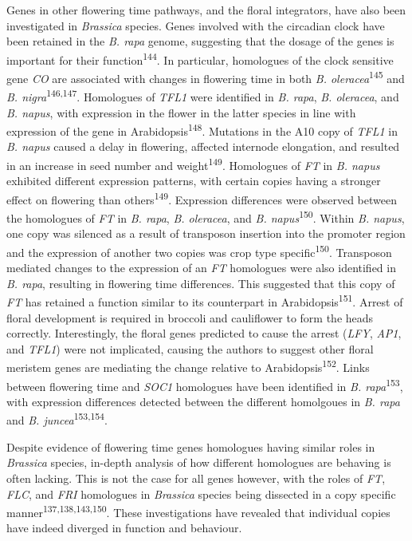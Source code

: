 \documentclass[12pt,]{book}
\begin{document}
Genes in other flowering time pathways, and the floral integrators, have
also been investigated in \emph{Brassica} species. Genes involved with
the circadian clock have been retained in the \emph{B. rapa} genome,
suggesting that the dosage of the genes is important for their
function\textsuperscript{144}. In particular, homologues of the clock
sensitive gene \emph{CO} are associated with changes in flowering time
in both \emph{B. oleracea}\textsuperscript{145} and \emph{B.
nigra}\textsuperscript{146,147}. Homologues of \emph{TFL1} were
identified in \emph{B. rapa}, \emph{B. oleracea}, and \emph{B. napus},
with expression in the flower in the latter species in line with
expression of the gene in Arabidopsis\textsuperscript{148}. Mutations in
the A10 copy of \emph{TFL1} in \emph{B. napus} caused a delay in
flowering, affected internode elongation, and resulted in an increase in
seed number and weight\textsuperscript{149}. Homologues of \emph{FT} in
\emph{B. napus} exhibited different expression patterns, with certain
copies having a stronger effect on flowering than
others\textsuperscript{149}. Expression differences were observed
between the homologues of \emph{FT} in \emph{B. rapa}, \emph{B.
oleracea}, and \emph{B. napus}\textsuperscript{150}. Within \emph{B.
napus}, one copy was silenced as a result of transposon insertion into
the promoter region and the expression of another two copies was crop
type specific\textsuperscript{150}. Transposon mediated changes to the
expression of an \emph{FT} homologues were also identified in \emph{B.
rapa}, resulting in flowering time differences. This suggested that this
copy of \emph{FT} has retained a function similar to its counterpart in
Arabidopsis\textsuperscript{151}. Arrest of floral development is
required in broccoli and cauliflower to form the heads correctly.
Interestingly, the floral genes predicted to cause the arrest
(\emph{LFY}, \emph{AP1}, and \emph{TFL1}) were not implicated, causing
the authors to suggest other floral meristem genes are mediating the
change relative to Arabidopsis\textsuperscript{152}. Links between
flowering time and \emph{SOC1} homologues have been identified in
\emph{B. rapa}\textsuperscript{153}, with expression differences
detected between the different homolgoues in \emph{B. rapa} and \emph{B.
juncea}\textsuperscript{153,154}.

Despite evidence of flowering time genes homologues having similar roles
in \emph{Brassica} species, in-depth analysis of how different
homologues are behaving is often lacking. This is not the case for all
genes however, with the roles of \emph{FT}, \emph{FLC}, and \emph{FRI}
homologues in \emph{Brassica} species being dissected in a copy specific
manner\textsuperscript{137,138,143,150}. These investigations have
revealed that individual copies have indeed diverged in function and
behaviour.
\end{document}
